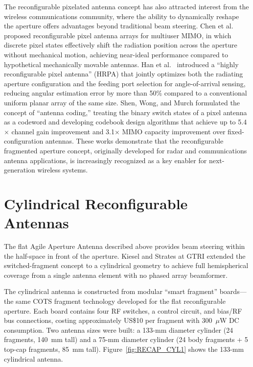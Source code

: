 The reconfigurable pixelated antenna concept has also attracted interest from the wireless communications community, where the ability to dynamically reshape the aperture offers advantages beyond traditional beam steering.  Chen et al.\ \cite{Chen2025REMAA} proposed reconfigurable pixel antenna arrays for multiuser MIMO, in which discrete pixel states effectively shift the radiation position across the aperture without mechanical motion, achieving near-ideal performance compared to hypothetical mechanically movable antennas.  Han et al.\ \cite{Han2026AngularSensing} introduced a ``highly reconfigurable pixel antenna'' (HRPA) that jointly optimizes both the radiating aperture configuration and the feeding port selection for angle-of-arrival sensing, reducing angular estimation error by more than 50\% compared to a conventional uniform planar array of the same size.  Shen, Wong, and Murch \cite{Shen2025AntennaCoding} formulated the concept of ``antenna coding,'' treating the binary switch states of a pixel antenna as a codeword and developing codebook design algorithms that achieve up to 5.4$\times$ channel gain improvement and 3.1$\times$ MIMO capacity improvement over fixed-configuration antennas.  These works demonstrate that the reconfigurable fragmented aperture concept, originally developed for radar and communications antenna applications, is increasingly recognized as a key enabler for next-generation wireless systems.

\section{Cylindrical Reconfigurable Antennas}

The flat Agile Aperture Antenna described above provides beam steering within the half-space in front of the aperture.  Kiesel and Strates \cite{Kiesel2017Cylindrical} at GTRI extended the switched-fragment concept to a cylindrical geometry to achieve full hemispherical coverage from a single antenna element with no phased array beamformer.

The cylindrical antenna is constructed from modular ``smart fragment'' boards---the same COTS fragment technology developed for the flat reconfigurable aperture.  Each board contains four RF switches, a control circuit, and bias/RF bus connections, costing approximately US\$10 per fragment with 300~$\mu$W DC consumption.  Two antenna sizes were built: a 133-mm diameter cylinder (24 fragments, 140~mm tall) and a 75-mm diameter cylinder (24 body fragments + 5 top-cap fragments, 85~mm tall).  Figure~\ref{fig:RECAP_CYL1} shows the 133-mm cylindrical antenna.

